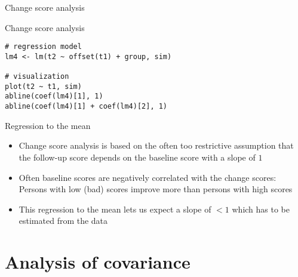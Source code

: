 \documentclass[aspectratio=169]{beamer}
\begin{document}
\begin{frame}{Change score analysis}
\begin{center}
\end{center}
\end{frame}

{

\begin{frame}[fragile]{Change score analysis}
\begin{lstlisting}
# regression model
lm4 <- lm(t2 ~ offset(t1) + group, sim)

# visualization
plot(t2 ~ t1, sim)
abline(coef(lm4)[1], 1)
abline(coef(lm4)[1] + coef(lm4)[2], 1)
\end{lstlisting}
\end{frame}

}

\begin{frame}{Regression to the mean}
\begin{itemize}
  \item Change score analysis is based on the often too restrictive
    assumption that the follow-up score depends on the baseline score with
    a slope of $1$
  \item Often baseline scores are negatively correlated with the change
    scores:\\
    Persons with low (bad) scores improve more than persons with high scores
  \item This regression to the mean lets us expect a slope of $< 1$ which
    has to be estimated from the data
\end{itemize}
\end{frame}

\section[ANCOVA]{Analysis of covariance}
\end{document}
